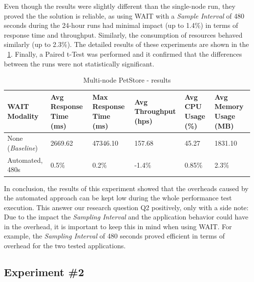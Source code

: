 \documentclass[runningheads,a4paper]{llncs}
\begin{document}
Even though the results were slightly different than the single-node run,
they proved the the solution is reliable, as using WAIT with a
\emph{Sample Interval} of 480 seconds during the 24-hour runs had minimal impact
(up to 1.4\%) in terms of response time and throughput. Similarly, the
consumption of resources behaved similarly (up to 2.3\%). The detailed results of 
these experiments are shown in the \tablename ~\ref{Portal2}. Finally, a
Paired t-Test was performed and it confirmed that the differences between the
runs were not statistically significant.

\begin{table}[!h]
\caption{Multi-node PetStore - results}
\label{Portal2}
\centering
\begin{tabular}{p{}|p{}|p{}|p{}|p{}|p{}}
\hline
\bfseries WAIT Modality & \bfseries Avg Response Time (ms)& \bfseries Max
Response Time (ms)& \bfseries Avg Throughput (hps)& \bfseries Avg CPU Usage
(\%) & \bfseries Avg Memory Usage (MB)\\
\hline
None (\emph{Baseline}) 	& 2669.62	& 47346.10	& 157.68 	& 45.27 	& 1831.10\\
Automated, 480s 		& 0.5\%		& 0.2\%		& -1.4\% 	& 0.85\% 	& 2.3\%\\
\hline
\end{tabular}
\end{table}

In conclusion, the results of this experiment showed that the overheads
caused by the automated approach can be kept low during the whole performance
test execution. This answer our research question Q2 positively, only with a side
note: Due to the impact the \emph{Sampling Interval} and the application
behavior could have in the overhead, it is important to keep this in mind when
using WAIT. For example, the \emph{Sampling Interval} of 480 seconds
proved efficient in terms of overhead for the two tested applications.

\subsection{Experiment \#2}
\end{document}
